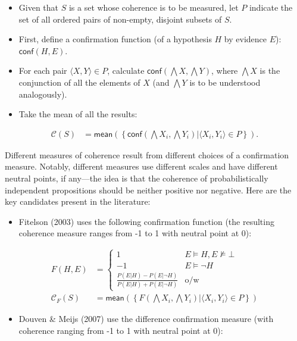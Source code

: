 \documentclass[
  10pt,
]{scrartcl}
\providecommand{\tightlist}{%
  \setlength{\itemsep}{0pt}\setlength{\parskip}{0pt}}
\begin{document}
\begin{itemize}
\item
  Given that \(S\) is a set whose coherence is to be measured, let \(P\)
  indicate the set of all ordered pairs of non-empty, disjoint subsets
  of \(S\).
\item
  First, define a confirmation function (of  a hypothesis \(H\) by evidence  \(E\)): \(\mathsf{conf}(H,E)\).
\item
  For each pair \(\langle X, Y \rangle \in P\), calculate
  \(\mathsf{conf}(\bigwedge X, \bigwedge Y)\), where $\bigwedge X$  is the conjunction of all the elements of $X$ (and $\bigwedge Y$ is to be understood analogously).
\item
  Take the mean of all the results:
\end{itemize}

\begin{align*}
    \mathcal{C}(S) & =
\mathsf{mean}\left(\left\{\mathsf{conf}(\bigwedge X_i, \bigwedge Y_i) | \langle X_i, Y_i \rangle \in P\right\} \right).
\end{align*}

\noindent Different measures of coherence result from different choices of a confirmation measure. Notably, different measures use different scales and have different neutral points, if any---the idea is that the coherence of probabilistically independent propositions should be neither positive nor
negative. Here are the key candidates present in the literature:

\begin{itemize}
\tightlist
\item
  Fitelson (2003) uses the following confirmation function (the resulting coherence measure ranges from -1 to 1 with neutral point at 0):
\end{itemize}

\begin{align}
    F(H,E) & = \begin{cases}
    1 & E\models H, E\not \models \bot \\
    -1 & E \models \neg H\\
    \frac{P(E|H)-P(E|\neg H)}{P(E|H)+P(E|\neg H)} & \mbox{o/w}
    \end{cases} \nonumber \\
\tag{Fitelson}  
    \mathcal{C}_{F}(S) & =
\mathsf{mean}\left(\left\{F(\bigwedge X_i, \bigwedge Y_i) | \langle X_i, Y_i\rangle \in P\right\} \right)
\end{align}

\begin{itemize}
\tightlist
\item
  Douven \& Meijs (2007) use the difference confirmation measure (with coherence ranging from -1 to 1 with neutral point at 0):
\end{itemize}
\end{document}
